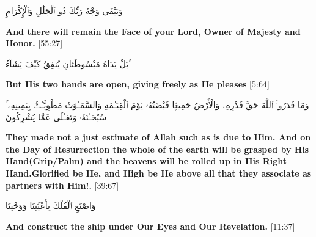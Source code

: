 \begin{center}
    \begin{RLtext}
        وَيَبْقَىٰ وَجْهُ رَبِّكَ ذُو ٱلْجَلَٰلِ وَٱلْإِكْرَامِ 
    \end{RLtext}
    \textbf{And there will remain the Face of your Lord, Owner of Majesty and Honor.} [55:27]
\end{center}

\begin{center}
	\begin{RLtext}
        بَلْ يَدَاهُ مَبْسُوطَتَانِ يُنفِقُ كَيْفَ يَشَآءُ ۚ
	\end{RLtext}
	\textbf{But His two hands are open, giving freely as He pleases} [5:64]
\end{center}
\begin{center}
    \begin{RLtext}
        وَمَا قَدَرُوا۟ ٱللَّهَ حَقَّ قَدْرِهِۦ وَالْأَرْضُ جَمِيعًۭا قَبْضَتُهُۥ يَوْمَ ٱلْقِيَـٰمَةِ وَالسَّمَـٰوَٰتُ مَطْوِيَّـٰتٌۢ بِيَمِينِهِۦ ۚ سُبْحَـٰنَهُۥ وَتَعَـٰلَىٰ عَمَّا يُشْرِكُونَ 
    \end{RLtext}
\end{center}
\textbf{They made not a just estimate of Allah such as is due to Him. And on the Day of Resurrection the whole of the earth will be grasped by His Hand(Grip/Palm) and the heavens will be rolled up in His Right Hand.Glorified be He, and High be He above all that they associate as partners with Him!.} [39:67]
\begin{center}
    \begin{RLtext}
        وَاصْنَعِ ٱلْفُلْكَ بِأَعْيُنِنَا وَوَحْيِنَا
    \end{RLtext}
    \textbf{And construct the ship under Our Eyes and Our Revelation.} [11:37]
\end{center}
